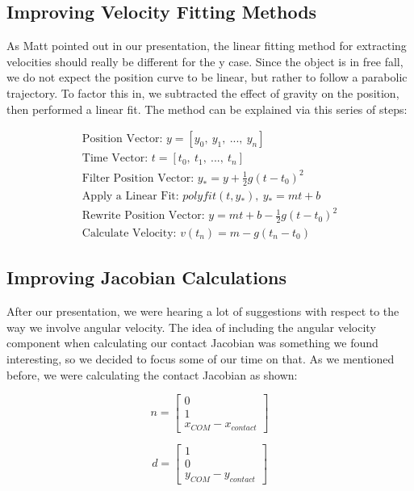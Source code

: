 \documentclass{article}
\begin{document}
\subsection{Improving Velocity Fitting Methods}
As Matt pointed out in our presentation, the linear fitting method for extracting velocities should really be different for the y case. Since the object is in free fall, we do not expect the position curve to be linear, but rather to follow a parabolic trajectory. To factor this in, we subtracted the effect of gravity on the position, then performed a linear fit. The method can be explained via this series of steps:

\begin{align*}
    \mbox{Position Vector: } y = [y_0,\ y_1,\ ...,\ y_n] \\
    \mbox{Time Vector: } t = [t_0,\ t_1,\ ...,\ t_n] \\
    \mbox{Filter Position Vector:  } y_* = y +\frac{1}{2}g(t-t_0)^2 \\
    \mbox{Apply a  Linear Fit: } polyfit(t, y_*),\ y_* = mt+ b \\
    \mbox{Rewrite Position Vector: } y = mt + b - \frac{1}{2}g(t-t_0)^2 \\
    \mbox{Calculate Velocity: } v(t_n)  = m - g (t_n - t_0) 
\end{align*}



\subsection{Improving Jacobian Calculations}
After our presentation, we were hearing a lot of suggestions with respect to the way we involve angular velocity. The idea of including the angular velocity component when calculating our contact Jacobian was something we found interesting, so we decided to focus some of our time on that. As we mentioned before, we were calculating the contact Jacobian as shown: 

\begin{equation}
n = 
\begin{bmatrix} 
 0 \\
 1 \\
 x_{COM}-x_{contact} 
\end{bmatrix}
\end{equation}

\begin{equation}
d = 
\begin{bmatrix} 
 1 \\
 0 \\
 y_{COM}-y_{contact} 
\end{bmatrix}
\end{equation}
\end{document}
